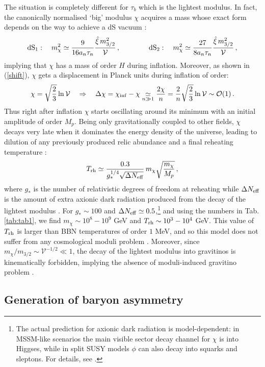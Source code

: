 \documentclass[11pt,a4paper]{article}
\newcommand{\be}{\begin{equation}}
\newcommand{\ee}{\end{equation}}
\newcommand\vo{{\mathcal{V}}}
\newcommand{\mc}{\mathcal}
\begin{document}
The situation is completely different for $\tau_b$ which is the lightest modulus. In fact, the canonically normalised `big' modulus $\chi$ acquires a mass whose exact form depends on the way to achieve a dS vacuum \cite{Aparicio:2014wxa}: 
\be
{\rm dS}_1: \quad m_\chi^2 \simeq \frac{9}{16 a_n \tau_n} \frac{\hat\xi \,m_{3/2}^2}{\vo}\,, \qquad \qquad 
{\rm dS}_2: \quad m_\chi^2 \simeq \frac{27}{8 a_n \tau_n} \frac{\hat\xi\, m_{3/2}^2}{\vo} \,,
\label{eq:volumemass}
\ee
implying that $\chi$ has a mass of order $H$ during inflation. Moreover, as shown in (\ref{shift}), $\chi$ gets a displacement in Planck units during inflation of order:
\be
\chi = \sqrt{\frac 23}\ln\vo\quad\Rightarrow\quad \Delta\chi = \chi_{\rm inf} -\chi \underset{n\gg 1}{\simeq} \frac{2\chi}{n} =
\frac{2}{n} \sqrt{\frac 23}\ln\vo \sim \mc{O}(1)\,.
\ee
Thus right after inflation $\chi$ starts oscillating around its minimum with an initial amplitude of order $M_p$. Being only gravitationally coupled to other fields, $\chi$ decays very late when it dominates the energy density of the universe, leading to dilution of any previously produced relic abundance and a final reheating temperature \cite{DMDRcorr}:
\be \label{eq:treheatingmod}
T_{\rm rh} \simeq \frac{0.3}{g_*^{1/4} \sqrt{\Delta N_{\rm eff}}}\,m_\chi\sqrt{\frac{m_\chi}{M_p}}\,,
\ee
where $g_*$ is the number of relativistic degrees of freedom at reheating while $\Delta N_{\rm eff}$ is the amount of extra axionic dark radiation produced from the decay of the lightest modulus \cite{Cicoli:2012aq,Cicoli:2015bpq}. For $g_*\sim 100$ and $\Delta N_{\rm eff}\simeq 0.5$,\footnote{The actual prediction for axionic dark radiation is model-dependent: in MSSM-like scenarios the main visible sector decay channel for $\chi$ is into Higgses, while in split SUSY models $\phi$ can also decay into squarks and sleptons. For details, see \cite{Cicoli:2012aq,Cicoli:2015bpq}.} and using the numbers in Tab. \ref{tab:tab1}, we find $m_\chi \sim 10^{8}-10^{9}$ GeV and $T_{\rm rh}\sim 10^{3}-10^{4}$ GeV. This value of $T_{\rm rh}$ is larger than BBN temperatures of order $1$ MeV, and so this model does not suffer from any cosmological moduli problem \cite{CMP}. Moreover, since $m_\chi/m_{3/2} \sim \vo^{-1/2} \ll 1$, the decay of the lightest modulus into gravitinos is kinematically forbidden, implying the absence of moduli-induced gravitino problem \cite{gravProbl}.


\subsection{Generation of baryon asymmetry}
\label{ssec:baryonasymmetry}
\end{document}

